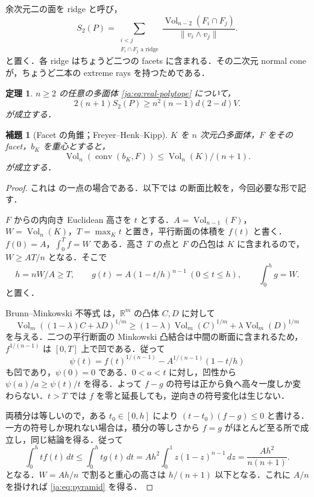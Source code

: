 \documentclass[12pt]{amsart}
\theoremstyle{definition}
\theoremstyle{remark}
\numberwithin{equation}{section}
\theoremstyle{plain}
\newtheorem{jthm}[thm]{定理}
\newtheorem{jlem}[thm]{補題}
\theoremstyle{definition}
\theoremstyle{remark}
\begin{document}
余次元二の面を ridge と呼び，
\begin{equation}\label{ja:eq:ridge-sum}
 S_2(P)=\sum_{\substack{i<j\\F_i\cap F_j\text{ a ridge}}}
 \frac{\operatorname{Vol}_{n-2}(F_i\cap F_j)}
      {\|v_i\wedge v_j\|}.
\end{equation}
と置く．各 ridge はちょうど二つの facets に含まれる．その二次元 normal cone が，ちょうど二本の extreme rays を持つためである．

\begin{jthm}\label{ja:thm:convex}
$n\ge2$ の任意の多面体 \eqref{ja:eq:real-polytope} について，
\begin{equation}\label{ja:eq:convex-main}
 2(n+1)S_2(P)\ge n^2(n-1)d(2-d)V.
\end{equation}
が成立する．
\end{jthm}

\begin{jlem}[Facet の角錐；Freyer--Henk--Kipp]\label{ja:lem:pyramid}
$K$ を $n$ 次元凸多面体，$F$ をその facet，$b_K$ を重心とすると，
\begin{equation}\label{ja:eq:pyramid}
 \operatorname{Vol}_n(\operatorname{conv}(b_K,F))
 \le\operatorname{Vol}_n(K)/(n+1).
\end{equation}
が成立する．
\end{jlem}
\begin{proof}
これは \cite[Theorem~1.1]{ja:FHK} の一点の場合である．以下では \cite[Theorem~1.2(i) の証明]{ja:FHK} の断面比較を，今回必要な形で記す．

$F$ からの内向き Euclidean 高さを $t$ とする．$A=\operatorname{Vol}_{n-1}(F)$，$W=\operatorname{Vol}_n(K)$，$T=\max_Kt$ と置き，平行断面の体積を $f(t)$ と書く．$f(0)=A$，$\int_0^T f=W$ である．高さ $T$ の点と $F$ の凸包は $K$ に含まれるので，$W\ge AT/n$ となる．そこで
\begin{equation}\label{ja:eq:comparison}
 h=nW/A\ge T,\qquad
 g(t)=A(1-t/h)^{n-1}\ (0\le t\le h),\qquad
 \int_0^h g=W.
\end{equation}
と置く．

Brunn--Minkowski 不等式 \cite[Theorem~4.1]{ja:Gardner} は，$\mathbb R^m$ の凸体 $C,D$ に対して
\[
\operatorname{Vol}_m((1-\lambda)C+\lambda D)^{1/m}
\ge(1-\lambda)\operatorname{Vol}_m(C)^{1/m}
+\lambda\operatorname{Vol}_m(D)^{1/m}
\]
を与える．二つの平行断面の Minkowski 凸結合は中間の断面に含まれるため，$f^{1/(n-1)}$ は $[0,T]$ 上で凹である．従って
\[
\psi(t)=f(t)^{1/(n-1)}-A^{1/(n-1)}(1-t/h)
\]
も凹であり，$\psi(0)=0$ である．$0<a<t$ に対し，凹性から $\psi(a)/a\ge\psi(t)/t$ を得る．よって $f-g$ の符号は正から負へ高々一度しか変わらない．$t>T$ では $f$ を零と延長しても，逆向きの符号変化は生じない．

両積分は等しいので，ある $t_0\in[0,h]$ により $(t-t_0)(f-g)\le0$ と書ける．一方の符号しか現れない場合は，積分の等しさから $f=g$ がほとんど至る所で成立し，同じ結論を得る．従って
\begin{equation}\label{ja:eq:moment}
 \int_0^h t f(t)\,dt
 \le\int_0^h t g(t)\,dt
 =Ah^2\int_0^1 z(1-z)^{n-1}\,dz
 =\frac{Ah^2}{n(n+1)}.
\end{equation}
となる．$W=Ah/n$ で割ると重心の高さは $h/(n+1)$ 以下となる．これに $A/n$ を掛ければ \eqref{ja:eq:pyramid} を得る．
\end{proof}
\end{document}
